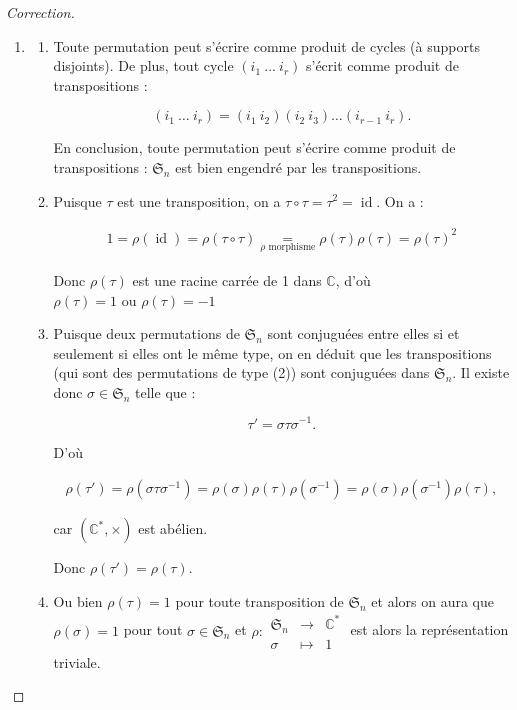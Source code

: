 \documentclass[french]{book}
\theoremstyle{definition}
\begin{document}
\begin{proof}[Correction]

  \

  \begin{enumerate}
    \item \begin{enumerate}
      \item Toute permutation peut s'écrire comme produit de cycles (à supports disjoints). De plus, tout cycle \((i_1 \ \dots \ i_r)\) s'écrit comme produit de transpositions :

      \[(i_1 \ \dots \ i_r) = (i_1 \ i_2) (i_2 \ i_3) \dots (i _{r-1} \ i_r).\]

      En conclusion, toute permutation peut s'écrire comme produit de transpositions : \(\mathfrak{S}_n\) est bien engendré par les transpositions.
      \item Puisque \(\tau\) est une transposition, on a \(\tau \circ \tau = \tau^2 = \operatorname{id}\). On a :

      \begin{gather*}
        1 = \rho(\operatorname{id}) = \rho(\tau \circ \tau) \underset{\rho \text{ morphisme}}{=} \rho(\tau) \rho(\tau) = \rho(\tau)^2
      \end{gather*}

      Donc \(\rho(\tau)\) est une racine carrée de 1 dans \(\mathbb{C}\), d'où \(\rho(\tau)=1 \text{ ou } \rho(\tau)=-1 \)

      \item Puisque deux permutations de \(\mathfrak{S}_n\) sont conjuguées entre elles si et seulement si elles ont le même type, on en déduit que les transpositions (qui sont des permutations de type (2)) sont conjuguées dans \(\mathfrak{S}_n\). Il existe donc \(\sigma \in \mathfrak{S}_n\) telle que :

      \[\tau' = \sigma \tau \sigma ^{-1}.\]

      D'où

      \begin{gather*}
        \rho(\tau') = \rho(\sigma \tau \sigma ^{-1}) = \rho(\sigma)\rho(\tau)\rho(\sigma^{-1}) = \rho(\sigma) \rho(\sigma ^{-1}) \rho(\tau),
      \end{gather*}

      car \((\mathbb{C}^{*}, \times)\) est abélien.

      Donc \(\rho(\tau') = \rho(\tau)\).

      \item Ou bien \(\rho(\tau)=1\) pour toute transposition de \(\mathfrak{S}_n\) et alors on aura que \(\rho(\sigma) = 1\) pour tout \(\sigma \in \mathfrak{S}_n\) et \(\rho :\begin{matrix}
      \mathfrak{S}_n & \longrightarrow & \mathbb{C}^{*} \\
       \sigma & \longmapsto & 1
      \end{matrix} \) est alors la représentation triviale.


\end{enumerate}
\end{enumerate}
\end{proof}
\end{document}
